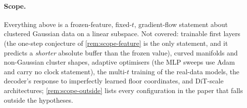 \paragraph{Scope.}
Everything above is a frozen-feature, fixed-$t$, gradient-flow statement about clustered Gaussian data on a linear subspace. Not covered: trainable first layers (the one-step conjecture of \cref{rem:scope-feature} is the only statement, and it predicts a \emph{shorter} absolute buffer than the frozen value), curved manifolds and non-Gaussian cluster shapes, adaptive optimisers (the MLP sweeps use Adam and carry no clock statement), the multi-$t$ training of the real-data models, the decoder's response to imperfectly learned floor coordinates, and DiT-scale architectures; \cref{rem:scope-outside} lists every configuration in the paper that falls outside the hypotheses.
